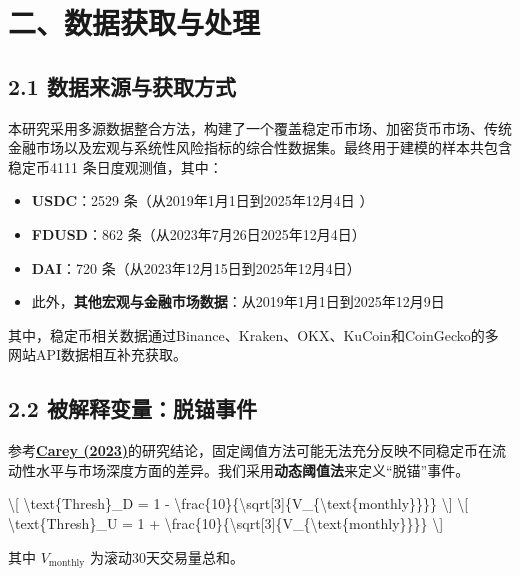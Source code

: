 \documentclass[
  letterpaper,
  DIV=11,
  numbers=noendperiod]{scrartcl}
\providecommand{\tightlist}{%
  \setlength{\itemsep}{0pt}\setlength{\parskip}{0pt}}
\begin{document}
\section{二、数据获取与处理}\label{ux4e8cux6570ux636eux83b7ux53d6ux4e0eux5904ux7406}

\subsection{\texorpdfstring{2.1
\textbf{数据来源与获取方式}}{2.1 数据来源与获取方式}}\label{ux6570ux636eux6765ux6e90ux4e0eux83b7ux53d6ux65b9ux5f0f}

本研究采用多源数据整合方法，构建了一个覆盖稳定币市场、加密货币市场、传统金融市场以及宏观与系统性风险指标的综合性数据集。最终用于建模的样本共包含
稳定币4111 条日度观测值，其中：

\begin{itemize}
\tightlist
\item
  \textbf{USDC}：2529 条（从2019年1月1日到2025年12月4日 ）
\item
  \textbf{FDUSD}：862 条（从2023年7月26日2025年12月4日）
\item
  \textbf{DAI}：720 条（从2023年12月15日到2025年12月4日）
\item
  此外，\textbf{其他宏观与金融市场数据}：从2019年1月1日到2025年12月9日
\end{itemize}

其中，稳定币相关数据通过Binance、Kraken、OKX、KuCoin和CoinGecko的多网站API数据相互补充获取。

\subsection{2.2
被解释变量：脱锚事件}\label{ux88abux89e3ux91caux53d8ux91cfux8131ux951aux4e8bux4ef6}

参考\href{Stablecoin\%20depegging\%20risk\%20prediction.pdf}{\textbf{Carey
(2023)}}的研究结论，固定阈值方法可能无法充分反映不同稳定币在流动性水平与市场深度方面的差异。我们采用\textbf{动态阈值法}来定义``脱锚''事件。

\textbackslash{[} \textbackslash text\{Thresh\}\_D = 1 -
\textbackslash frac\{10\}\{\textbackslash sqrt{[}3{]}\{V\_\{\textbackslash text\{monthly\}\}\}\}
\textbackslash{]} \textbackslash{[} \textbackslash text\{Thresh\}\_U = 1
+
\textbackslash frac\{10\}\{\textbackslash sqrt{[}3{]}\{V\_\{\textbackslash text\{monthly\}\}\}\}
\textbackslash{]}

其中 \(V_{\text{monthly}}\) 为滚动30天交易量总和。
\end{document}
